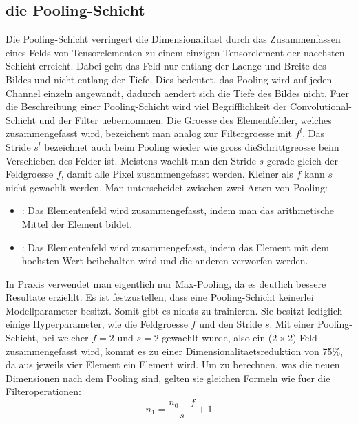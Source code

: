 \subsection{die Pooling-Schicht}
Die Pooling-Schicht verringert die Dimensionalitaet durch das Zusammenfassen eines Felds
von Tensorelementen zu einem einzigen Tensorelement der naechsten Schicht
erreicht. Dabei geht das Feld nur entlang der Laenge und Breite des Bildes und
nicht entlang der Tiefe. Dies bedeutet, das Pooling wird auf jeden Channel
einzeln angewandt, dadurch aendert sich die Tiefe des Bildes nicht.
\para{}
Fuer die Beschreibung einer Pooling-Schicht wird viel Begrifflichkeit der
Convolutional-Schicht und der Filter uebernommen.
Die Groesse des Elementfelder, welches zusammengefasst wird, bezeichent man analog zur
Filtergroesse mit $f^l$. Das Stride $s^l$ bezeichnet auch beim Pooling wieder wie
gross dieSchrittgreosse beim Verschieben des Felder ist. Meistens waehlt man den
Stride $s$ gerade gleich der Feldgroesse $f$, damit alle Pixel
zusammengefasst werden. Kleiner als $f$ kann $s$ nicht gewaehlt werden.
\para{}
Man unterscheidet zwischen zwei Arten von Pooling:
\begin{itemize}
  \item{: Das Elementenfeld wird zusammengefasst, indem
    man das arithmetische Mittel der Element bildet.}
  \item{: Das Elementenfeld wird zusammengefasst, indem das
    Element mit dem hoehsten Wert beibehalten wird und die anderen verworfen werden.}
\end{itemize}
In Praxis verwendet man eigentlich nur Max-Pooling, da es deutlich bessere
Resultate erziehlt.
\para{}
Es ist festzustellen, dass eine Pooling-Schicht keinerlei Modellparameter
besitzt. Somit gibt es nichts zu trainieren. Sie besitzt lediglich einige
Hyperparameter, wie die Feldgroesse $f$ und den Stride $s$.
\para{}
Mit einer Pooling-Schicht, bei welcher $f = 2$ und $s = 2$ gewaehlt wurde, also
ein ($2 \times 2$)-Feld zusammengefasst wird, kommt es zu einer
Dimensionalitaetsreduktion von 75\%, da aus jeweils vier Element ein Element wird.
\para{}
Um zu berechnen, was die neuen Dimensionen nach dem Pooling sind, gelten sie
gleichen Formeln wie fuer die Filteroperationen:
\\
\begin{equation}
  n_1 = \frac{n_0 - f}{s} + 1
\end{equation}
\\

